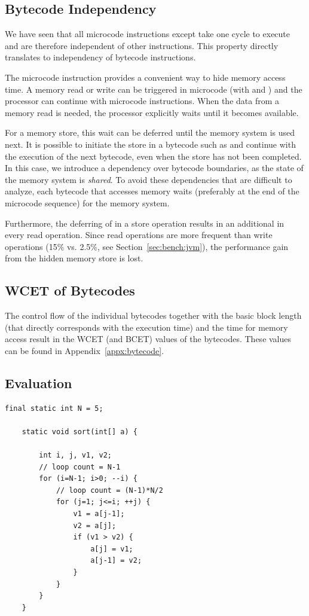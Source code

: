 \subsection{Bytecode Independency}

We have seen that all microcode instructions except  take
one cycle to execute and are therefore independent of other
instructions. This property directly translates to independency of
bytecode instructions.

The  microcode instruction provides a convenient way to
hide memory access time. A memory read or write can be triggered in
microcode (with  and ) and the processor can
continue with microcode instructions. When the data from a memory
read is needed, the processor explicitly waits until it becomes
available.

For a memory store, this wait can be deferred until the memory
system is used next. It is possible to initiate the store in a
bytecode such as  and continue with the execution of
the next bytecode, even when the store has not been completed. In
this case, we introduce a dependency over bytecode boundaries, as
the state of the memory system is \emph{shared}. To avoid these
dependencies that are difficult to analyze, each bytecode that
accesses memory waits (preferably at the end of the microcode
sequence) for the memory system.

Furthermore, the deferring of  in a store operation
results in an additional  in every read operation. Since
read operations are more frequent than write operations (15\% vs.
2.5\%, see Section~\ref{sec:bench:jvm}), the performance gain from
the hidden memory store is lost.

\subsection{WCET of Bytecodes}

The control flow of the individual bytecodes together with the basic
block length (that directly corresponds with the execution time) and
the time for memory access result in the WCET (and BCET) values of
the bytecodes. These values can be found in
Appendix~\ref{appx:bytecode}.

\subsection{Evaluation}

\begin{lstlisting}[float,caption={Bubble Sort in Java},
label=lst:results:wcet:sort:prog]
    final static int N = 5;

    static void sort(int[] a) {

        int i, j, v1, v2;
        // loop count = N-1
        for (i=N-1; i>0; --i) {
            // loop count = (N-1)*N/2
            for (j=1; j<=i; ++j) {
                v1 = a[j-1];
                v2 = a[j];
                if (v1 > v2) {
                    a[j] = v1;
                    a[j-1] = v2;
                }
            }
        }
    }
\end{lstlisting}

